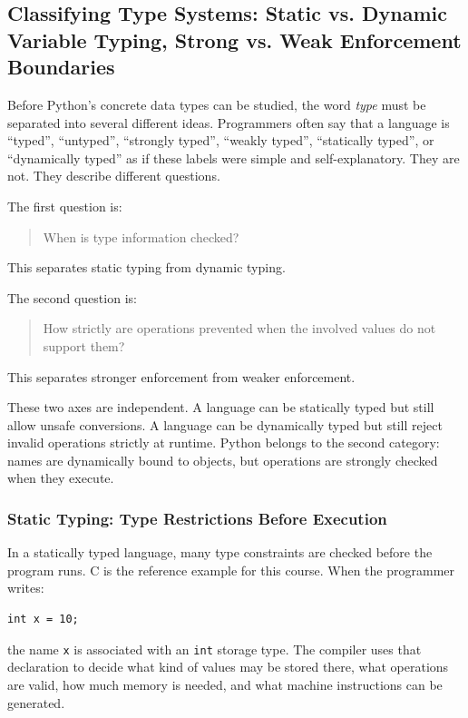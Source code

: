 \subsection{Classifying Type Systems: Static vs. Dynamic Variable Typing, Strong vs. Weak Enforcement Boundaries}

Before Python's concrete data types can be studied, the word \emph{type} must be separated into several different ideas. Programmers often say that a language is ``typed'', ``untyped'', ``strongly typed'', ``weakly typed'', ``statically typed'', or ``dynamically typed'' as if these labels were simple and self-explanatory. They are not. They describe different questions.

The first question is:

\begin{quote}
When is type information checked?
\end{quote}

This separates static typing from dynamic typing.

The second question is:

\begin{quote}
How strictly are operations prevented when the involved values do not support them?
\end{quote}

This separates stronger enforcement from weaker enforcement.

These two axes are independent. A language can be statically typed but still allow unsafe conversions. A language can be dynamically typed but still reject invalid operations strictly at runtime. Python belongs to the second category: names are dynamically bound to objects, but operations are strongly checked when they execute.

\subsubsection*{Static Typing: Type Restrictions Before Execution}

In a statically typed language, many type constraints are checked before the program runs. C is the reference example for this course. When the programmer writes:

\begin{verbatim}
int x = 10;
\end{verbatim}

the name \texttt{x} is associated with an \texttt{int} storage type. The compiler uses that declaration to decide what kind of values may be stored there, what operations are valid, how much memory is needed, and what machine instructions can be generated.


